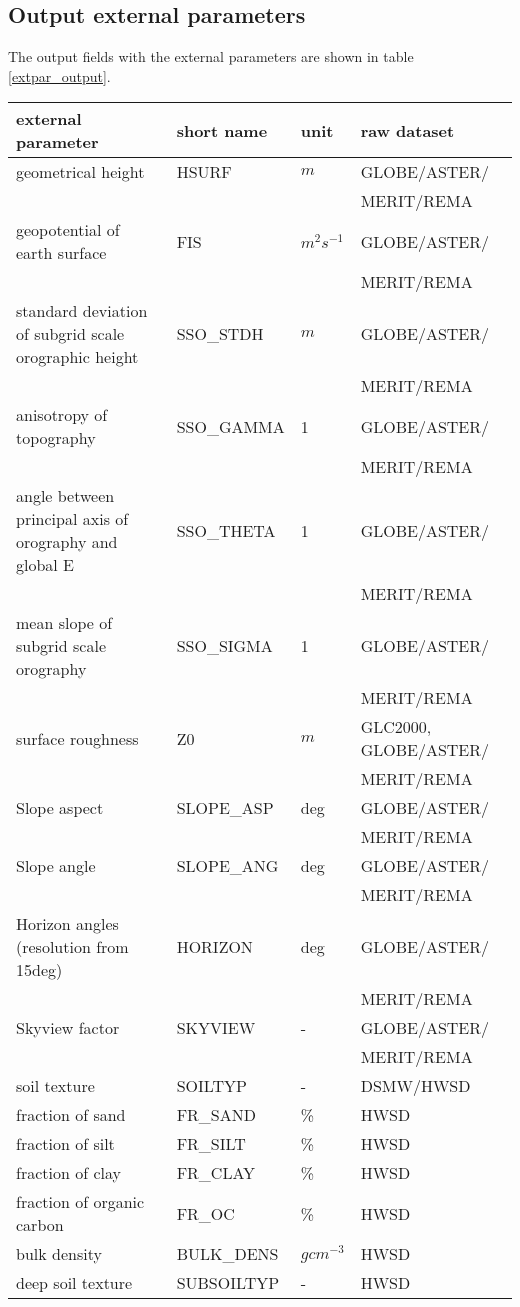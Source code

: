 \documentclass[a4paper,10pt,DIV14,BCOR1cm,titlepage,twoside]{scrartcl}
\providecommand{\tabularnewline}{\\}
\begin{document}
\subsection{Output external parameters}\label{main_output}
The output fields with the external parameters are shown in table \ref{extpar_output}.
\begin{longtable}{|p{6.5cm}|p{3cm}|p{1.6cm}|p{3.5cm}|}
\hline
\textbf{external parameter} &\textbf{short name} &\textbf{unit} &\textbf{raw dataset}  \tabularnewline
\hline
\endhead
\hline
geometrical height  &HSURF &$m$ &GLOBE/ASTER/  \tabularnewline
                    &      &    & MERIT/REMA   \tabularnewline  \hline
geopotential of earth surface &FIS &$ m^{2} s^{-1}$ &GLOBE/ASTER/  \tabularnewline
                    &      &    & MERIT/REMA   \tabularnewline \hline
standard deviation of subgrid scale orographic height  &SSO\_\-STDH  &$m$  &GLOBE/ASTER/  \tabularnewline 
                   &      &    & MERIT/REMA   \tabularnewline \hline
anisotropy of topography  &SSO\_\-GAMMA  & 1 &GLOBE/ASTER/  \tabularnewline 
                   &      &    & MERIT/REMA   \tabularnewline \hline
angle between principal axis of orography and global E  &SSO\_\-THETA  &1  &GLOBE/ASTER/  
\tabularnewline 
                   &      &    & MERIT/REMA   \tabularnewline \hline
mean slope of subgrid scale orography  &SSO\_\-SIGMA  & 1 &GLOBE/ASTER/  
\tabularnewline 
                   &      &    & MERIT/REMA   \tabularnewline \hline
surface roughness  &Z0  &$m$  &GLC2000, GLOBE/ASTER/  
\tabularnewline 
                   &      &    & MERIT/REMA   \tabularnewline \hline
Slope aspect &SLOPE\_\-ASP  &deg  & GLOBE/ASTER/
\tabularnewline 
                   &      &    & MERIT/REMA   \tabularnewline \hline
Slope angle &SLOPE\_\-ANG  &deg  & GLOBE/ASTER/
\tabularnewline 
                   &      &    & MERIT/REMA   \tabularnewline \hline
Horizon angles (resolution from 15deg) &HORIZON  &deg  & GLOBE/ASTER/
\tabularnewline 
                   &      &    & MERIT/REMA   \tabularnewline \hline
Skyview factor &SKYVIEW  &-  & GLOBE/ASTER/
\tabularnewline 
                   &      &    & MERIT/REMA   \tabularnewline \hline
soil texture  &SOILTYP  &-  & DSMW/HWSD
\tabularnewline \hline
fraction of sand & FR\_\-SAND & \% & HWSD
\tabularnewline \hline
fraction of silt & FR\_\-SILT & \% & HWSD
\tabularnewline \hline
fraction of clay & FR\_\-CLAY & \% & HWSD
\tabularnewline \hline
fraction of organic carbon & FR\_\-OC & \% & HWSD
\tabularnewline \hline
bulk density & BULK\_\-DENS & $g cm^{-3}$  & HWSD
\tabularnewline \hline
deep soil texture & SUBSOILTYP &-  & HWSD

\end{longtable}
\end{document}
